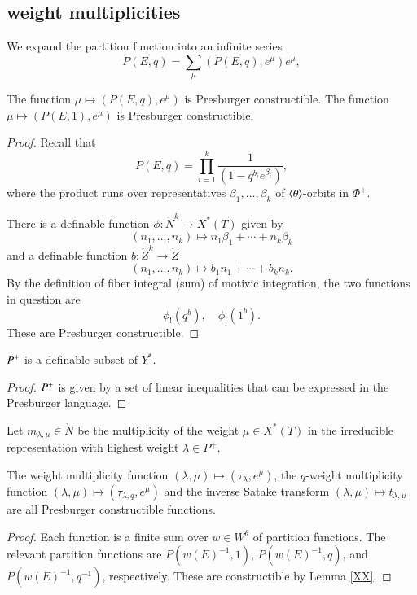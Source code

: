 \subsection{weight multiplicities}

We expand the partition function into an infinite series
\[
P(E,q) = \sum_\mu (P(E,q),e^\mu) e^{\mu},
\]

\begin{lemma}\label{lemma:partition}
The function $\mu\mapsto (P(E,q),e^\mu)$ is Presburger constructible.
The function $\mu\mapsto (P(E,1),e^\mu)$ is Presburger constructible.
\end{lemma}

\begin{proof} 
Recall that
\[
P(E,q) = \prod_{i=1}^k \frac{1}{ (1-q^{b_i} e^{\beta_i})},
\]
where the product runs over representatives $\beta_1,\ldots,\beta_k$ of $\langle{\theta}\rangle$-orbits in $\Phi^+$.

There is a definable function $\phi:\ring{N}^k\to X^*(T)$ given by
\[
(n_1,\ldots,n_k)\mapsto n_1 \beta_1+\cdots + n_k \beta_k
\]
and a definable function $b:\ring{Z}^k\to \ring{Z}$ 
\[
(n_1,\ldots,n_k)\mapsto b_1 n_1+\cdots + b_k n_k.
\]
By the definition of fiber integral (sum) of motivic integration,  the two  functions in question are
\[
\phi_! (q^b),\quad \phi_!(1^b).
\]
These are Presburger constructible.
\end{proof}

\begin{lemma}
$P^+$ is a definable subset of $Y^*$.
\end{lemma}

\begin{proof}
$P^+$ is given by a set of linear inequalities that can be expressed in the Presburger language.
\end{proof}


Let $m_{\lambda,\mu}\in \ring{N}$ be the multiplicity of the weight $\mu\in X^*(T)$
in the irreducible representation with highest weight $\lambda\in P^+$.


\begin{lemma}  The weight multiplicity function $(\lambda,\mu)\mapsto (\tau_\lambda,e^\mu)$, the $q$-weight multiplicity
function $(\lambda,\mu)\mapsto (\tau_{\lambda,q},e^\mu)$  and the inverse Satake transform $(\lambda,\mu)\mapsto t_{\lambda,\mu}$
are all Presburger constructible functions.
\end{lemma}

\begin{proof} 
Each function is a finite sum over $w\in W^\theta$ of partition functions.  The relevant partition functions
are $P(w(E)^{-1},1)$, $P(w(E)^{-1},q)$, and $P(w(E)^{-1},q^{-1})$, respectively.  These are constructible
by Lemma \ref{XX}.
\end{proof}




